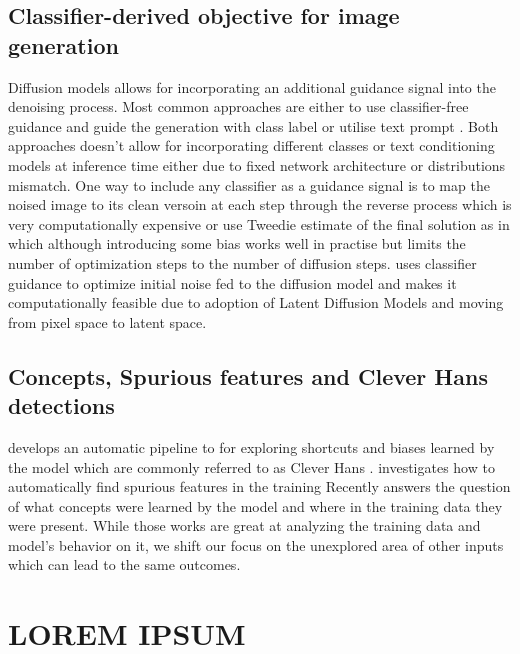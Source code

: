 \documentclass[licencjacka,en]{pracamgr}
\begin{document}
\section{Classifier-derived objective for image generation}
Diffusion models allows for incorporating an additional guidance signal into the denoising process. Most common approaches are either to use classifier-free guidance \cite{ho2022classifierfreediffusionguidance} and guide the generation with class label or utilise text prompt \cite{rombach2022highresolutionimagesynthesislatent}.
Both approaches doesn't allow for incorporating different classes or text conditioning models at inference time either due to fixed network architecture or distributions mismatch.
One way to include any classifier as a guidance signal is to map the noised image to its clean versoin at each step through the reverse process\cite{jeanneret2022diffusionmodelscounterfactualexplanations} which is very computationally expensive or use Tweedie estimate of the final solution as in \cite{sobieski2024rethinkingvisualcounterfactualexplanations} 
which although introducing some bias works well in practise but limits the number of optimization steps to the number of diffusion steps. 
\cite{augustin2024digindiffusionguidanceinvestigating} uses classifier guidance to optimize initial noise fed to the diffusion model and makes it computationally feasible due to adoption of Latent Diffusion Models and moving from pixel space to latent space.

\section{Concepts, Spurious features and Clever Hans detections}
\cite{Lapuschkin_2019} develops an automatic pipeline to for exploring shortcuts and biases learned by the model which are commonly referred to as Clever Hans \cite{pfungst1911cleverHans}.
\cite{neuhaus2023spuriousfeatureslargescale} investigates how to automatically find spurious features in the training
Recently \cite{dreyer2025mechanisticunderstandingvalidationlarge} answers the question of what concepts were learned by the model and where in the training data they were present. 
While those works are great at analyzing the training data and model's behavior on it, we shift our focus on the unexplored area of other inputs which can lead to the same outcomes.
\appendix

\chapter{LOREM IPSUM}


\end{document}
